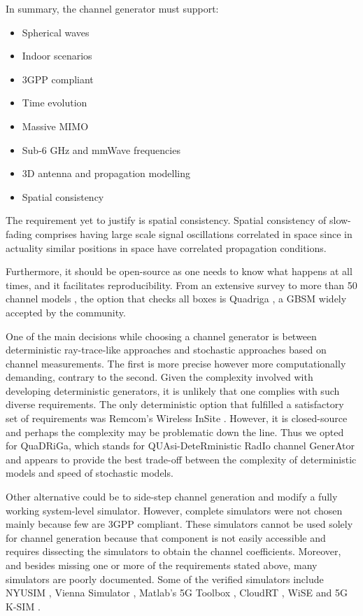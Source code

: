 In summary, the channel generator must support:

\setlength{\columnsep}{-2.5cm}
\begin{multicols}{2} 
    \begin{itemize}
        \item Spherical waves
        \item Indoor scenarios
        \item 3GPP compliant
        \item Time evolution
        \item Massive MIMO
        \item Sub-6 GHz and mmWave frequencies
        \item 3D antenna and propagation modelling
        \item Spatial consistency
    \end{itemize}
\end{multicols}

The requirement yet to justify is spatial consistency. Spatial consistency of slow-fading comprises having large scale signal oscillations correlated in space since in actuality similar positions in space have correlated propagation conditions.

Furthermore, it should be open-source as one needs to know what happens  at all times, and it facilitates reproducibility. From an extensive survey to more than 50 channel models \cite{channel_survey}, the option that checks all boxes is Quadriga \cite{quadriga}, a \ac{GBSM} widely accepted by the community.


One of the main decisions while choosing a channel generator is between deterministic ray-trace-like approaches and stochastic approaches based on channel measurements. The first is more precise however more computationally demanding, contrary to the second. Given the complexity involved with developing deterministic generators, it is unlikely that one complies with such diverse requirements. The only deterministic option that fulfilled a satisfactory set of requirements was Remcom's Wireless InSite \cite{remcom}. However, it is closed-source and perhaps the complexity may be problematic down the line. Thus we opted for QuaDRiGa, which stands for QUAsi-DeteRministic RadIo channel GenerAtor and appears to provide the best trade-off between the complexity of deterministic models and speed of stochastic models.


Other alternative could be to side-step channel generation and modify a fully working system-level simulator. However, complete simulators were not chosen mainly because few are 3GPP compliant. These simulators cannot be used solely for channel generation because that component is not easily accessible and requires dissecting the simulators to obtain the channel coefficients. Moreover, and besides missing one or more of the requirements stated above, many simulators are poorly documented. Some of the verified simulators include NYUSIM \cite{nyusim}, Vienna Simulator \cite{Vienna5GSLS}, Matlab's 5G Toolbox \cite{5G_toolbox}, CloudRT \cite{cloudRT}, WiSE \cite{wise} and 5G K-SIM \cite{8610404}.




